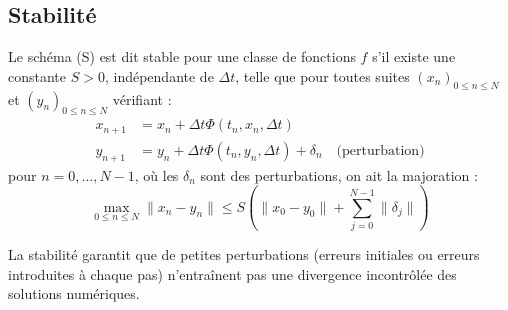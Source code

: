 \subsection{Stabilité}
\begin{definition}
Le schéma (S) est dit stable pour une classe de fonctions $f$ s'il existe une constante $S > 0$, indépendante de $\Delta t$, telle que pour toutes suites $(x_n)_{0 \le n \le N}$ et $(y_n)_{0 \le n \le N}$ vérifiant :
\begin{align*}
x_{n+1} &= x_n + \Delta t \Phi(t_n, x_n, \Delta t) \\
y_{n+1} &= y_n + \Delta t \Phi(t_n, y_n, \Delta t) + \delta_n \quad \text{(perturbation)}
\end{align*}
pour $n=0, \dots, N-1$, où les $\delta_n$ sont des perturbations, on ait la majoration :
\[
\max_{0 \le n \le N} \|x_n - y_n\| \le S \left( \|x_0 - y_0\| + \sum_{j=0}^{N-1} \|\delta_j\| \right)
\]
\end{definition}
La stabilité garantit que de petites perturbations (erreurs initiales ou erreurs introduites à chaque pas) n'entraînent pas une divergence incontrôlée des solutions numériques.

